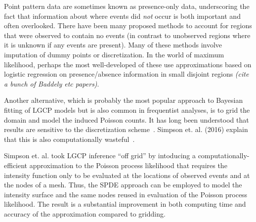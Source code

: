 \documentclass[]{interact}
\begin{document}
Point pattern data are sometimes known as presence-only data, underscoring
the fact that information about where events did \emph{not} occur is both
important and often overlooked. There have been many proposed methods to
account for regions that were observed to contain no events (in contrast to
unobserved regions where it is unknown if any events are present). Many of
these methods involve imputation of dummy points or discretization. In the
world of maximum likelihood, perhaps the most well-developed of these use
approximations based on logistic regression on presence/absence information in
small disjoint regions {\it (cite a bunch of Baddely etc papers)}.

Another alternative, which is probably the most popular approach to Bayesian
fitting of LGCP models but is also common in frequentist analyses, is to grid
the domain and model the induced Poisson counts. It has long been understood
that results are sensitive to the discretization scheme~\cite{brixmoeller}.
Simpson et. al. (2016) explain that this is also computationally
wasteful~\cite{simpsonetal}.

Simpson et. al. took LGCP inference ``off grid'' by intoducing a
computationally-efficient approximation to the Poisson process likelihood that
requires the intensity function only to be evaluated at the locations of
observed events and at the nodes of a mesh. Thus, the SPDE approach can be
employed to model the intensity surface and the same nodes reused in
evaluation of the Poisson process likelihood. The result is a substantial
improvement in both computing time and accuracy of the approximation compared
to gridding.

\end{document}
